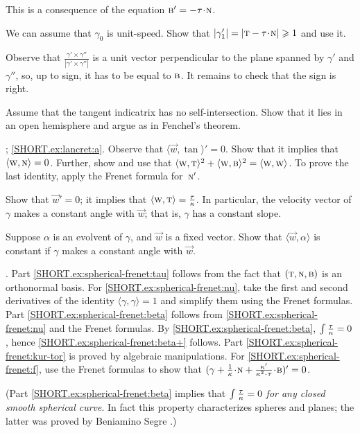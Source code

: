 \begin{multicols}{2}
This is a consequence of the equation $\bi' = - \tor\cdot \norm $.

We can assume that $\gamma_0$ is unit-speed.
Show that
$|\gamma_1'|=|\tan-\tor\cdot \norm|\ge 1$ and use it.

Observe that $\tfrac{\gamma'\times\gamma''}{|\gamma'\times\gamma''|}$ is a unit vector perpendicular to the plane spanned by $\gamma'$ and $\gamma''$, so, up to sign, it has to be equal to $\text{\sc{b}}$.
It remains to check that the sign is right.

 Assume that the tangent indicatrix has no self-intersection.
Show that it lies in an open hemisphere and argue as in Fenchel's theorem.

\parbf{\ref{ex:lancret}}; \ref{SHORT.ex:lancret:a}.
Observe that 
$\langle \vec w,\tan\rangle'=0$.
Show that it implies that $\langle \text{\sc{w}}, \text{\sc{n}}\rangle =0$.
Further, show and use that $\langle \text{\sc{w}}, \text{\sc{t}}\rangle^2+\langle \text{\sc{w}}, \text{\sc{b}}\rangle^2=\langle \text{\sc{w}}, \text{\sc{w}}\rangle$.
To prove the last identity, apply the Frenet formula for~$\text{\sc{n}}'$.

Show that $\vec w'=0$;
it implies that $\langle \vec w,\tan\rangle\z=\tfrac\tor\kur$.
In particular, the velocity vector of $\gamma$ makes a constant angle with $\vec w$; that is, $\gamma$ has a constant slope.

Suppose $\alpha$ is an evolvent of $\gamma$, and $\vec w$ is a fixed vector.
Show that $\langle \vec w,\alpha\rangle$ is constant if $\gamma$ makes a constant angle with $\vec w$.

\parbf{\ref{ex:spherical-frenet}}.
Part \ref{SHORT.ex:spherical-frenet:tau} follows from the fact that $(  \text{\sc{t}},\text{\sc{n}},\text{\sc{b}})$ is an orthonormal basis.
For \ref{SHORT.ex:spherical-frenet:nu}, take the first and second derivatives of the identity $\langle\gamma,\gamma\rangle=1$ and simplify them using the Frenet formulas.
Part \ref{SHORT.ex:spherical-frenet:beta} follows from \ref{SHORT.ex:spherical-frenet:nu} and the Frenet formulas.
By \ref{SHORT.ex:spherical-frenet:beta}, $\int\tfrac{\tau}{\kappa}=0$, hence \ref{SHORT.ex:spherical-frenet:beta+} follows.
Part \ref{SHORT.ex:spherical-frenet:kur-tor} is proved by algebraic manipulations.
For \ref{SHORT.ex:spherical-frenet:f},
use the Frenet formulas to show that $(\gamma+\tfrac1\kur\cdot \norm+\tfrac{\kur'}{\kur^2\cdot\tor}\cdot\bi)'=0$.

(Part \ref{SHORT.ex:spherical-frenet:beta} implies that \textit{$\int\tfrac{\tau}{\kappa}=0$ for any closed smooth spherical curve}.
In fact this property characterizes spheres and planes; the latter was proved by Beniamino Segre \cite{segre}.)


\end{multicols}
